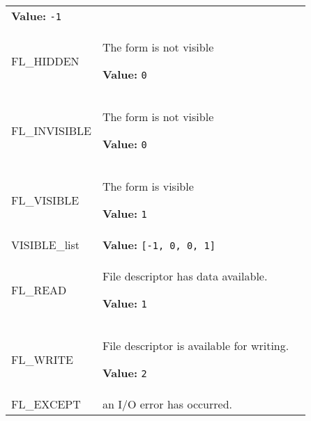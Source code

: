 \begin{longtable}{|p{\varnamewidth}|p{\vardescrwidth}|l}
\textbf{Value:} 
{\tt -1}&\\
\cline{1-2}
\raggedright F\-L\-\_\-H\-I\-D\-D\-E\-N\- & \raggedright The form is not visible

\textbf{Value:} 
{\tt 0}&\\
\cline{1-2}
\raggedright F\-L\-\_\-I\-N\-V\-I\-S\-I\-B\-L\-E\- & \raggedright The form is not visible

\textbf{Value:} 
{\tt 0}&\\
\cline{1-2}
\raggedright F\-L\-\_\-V\-I\-S\-I\-B\-L\-E\- & \raggedright The form is visible

\textbf{Value:} 
{\tt 1}&\\
\cline{1-2}
\raggedright V\-I\-S\-I\-B\-L\-E\-\_\-l\-i\-s\-t\- & \raggedright \textbf{Value:} 
{\tt \texttt{[}-1\texttt{, }0\texttt{, }0\texttt{, }1\texttt{]}}&\\
\cline{1-2}
\raggedright F\-L\-\_\-R\-E\-A\-D\- & \raggedright File descriptor has data available.

\textbf{Value:} 
{\tt 1}&\\
\cline{1-2}
\raggedright F\-L\-\_\-W\-R\-I\-T\-E\- & \raggedright File descriptor is available for writing.

\textbf{Value:} 
{\tt 2}&\\
\cline{1-2}
\raggedright F\-L\-\_\-E\-X\-C\-E\-P\-T\- & \raggedright an I/O error has occurred.


\end{longtable}
